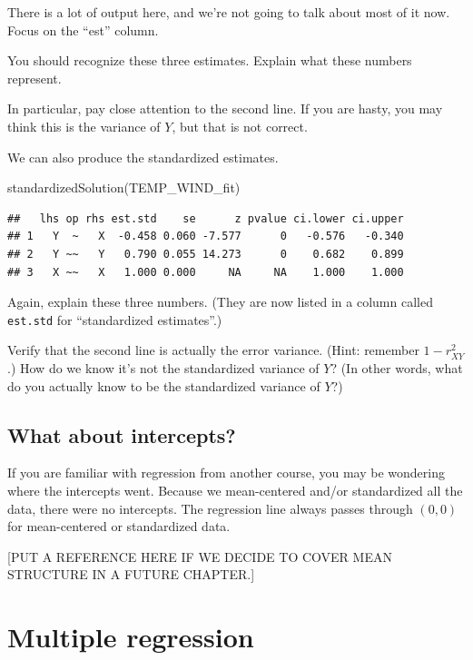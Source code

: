 \documentclass[
]{book}
\newenvironment{Shaded}{\begin{snugshade}}{\end{snugshade}}
\newcommand{\FunctionTok}[1]{\textcolor[rgb]{0.00,0.00,0.00}{#1}}
\newcommand{\NormalTok}[1]{#1}
\begin{document}
There is a lot of output here, and we're not going to talk about most of it now. Focus on the ``est'' column.

You should recognize these three estimates. Explain what these numbers represent.

In particular, pay close attention to the second line. If you are hasty, you may think this is the variance of \(Y\), but that is not correct.

We can also produce the standardized estimates.

\begin{Shaded}
\begin{Highlighting}[]
\FunctionTok{standardizedSolution}\NormalTok{(TEMP\_WIND\_fit)}
\end{Highlighting}
\end{Shaded}

\begin{verbatim}
##   lhs op rhs est.std    se      z pvalue ci.lower ci.upper
## 1   Y  ~   X  -0.458 0.060 -7.577      0   -0.576   -0.340
## 2   Y ~~   Y   0.790 0.055 14.273      0    0.682    0.899
## 3   X ~~   X   1.000 0.000     NA     NA    1.000    1.000
\end{verbatim}

Again, explain these three numbers. (They are now listed in a column called \texttt{est.std} for ``standardized estimates''.)

Verify that the second line is actually the error variance. (Hint: remember \(1 - r_{XY}^{2}\).) How do we know it's not the standardized variance of \(Y\)? (In other words, what do you actually know to be the standardized variance of \(Y\)?)

\hypertarget{simple-intercepts}{%
\section{What about intercepts?}\label{simple-intercepts}}

If you are familiar with regression from another course, you may be wondering where the intercepts went. Because we mean-centered and/or standardized all the data, there were no intercepts. The regression line always passes through \((0, 0)\) for mean-centered or standardized data.

{[}PUT A REFERENCE HERE IF WE DECIDE TO COVER MEAN STRUCTURE IN A FUTURE CHAPTER.{]}

\hypertarget{multiple}{%
\chapter{Multiple regression}\label{multiple}}
\end{document}
